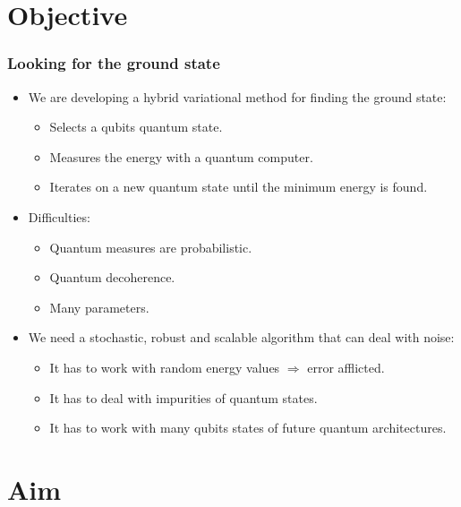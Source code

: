 \documentclass[10pt,t,xcolor=dvipsnames,aspectratio=169]{beamer}
\begin{document}
\section{Objective}

\begin{frame}
    \frametitle{Looking for the ground state}
    \begin{itemize}
        \item
            We are developing a hybrid variational method for finding the ground state:
            \begin{itemize}
                \item Selects a qubits quantum state.
                \item Measures the energy with a quantum computer.
                \item Iterates on a new quantum state until the minimum energy is found.
            \end{itemize}
        \item
            Difficulties:
            \begin{itemize}
                \item Quantum measures are probabilistic.
                \item Quantum decoherence.
                \item Many parameters.
            \end{itemize}
        \item
            We need a stochastic, robust and scalable algorithm that can deal with noise:
            \begin{itemize}
                \item It has to work with random energy values $\Rightarrow$ error afflicted.
                \item It has to deal with impurities of quantum states.
                \item It has to work with many qubits states of future quantum architectures.
            \end{itemize}
    \end{itemize}
\end{frame}

\section{Aim}
\end{document}
